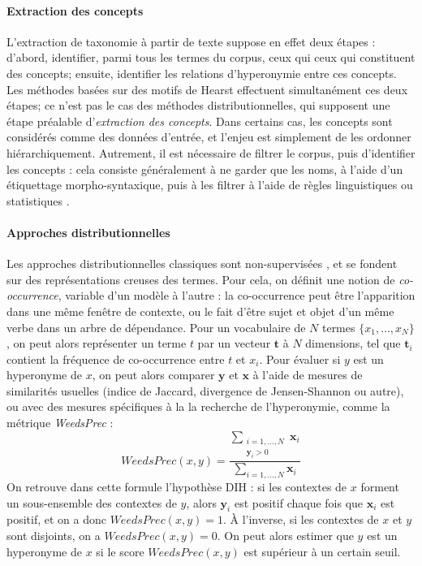 \paragraph{Extraction des concepts}

L'extraction de taxonomie à partir de texte suppose en effet deux étapes : d'abord, identifier, parmi tous les termes du corpus, ceux qui ceux qui constituent des concepts; ensuite, identifier les relations d'hyperonymie entre ces concepts. Les méthodes basées sur des motifs de Hearst effectuent simultanément ces deux étapes; ce n'est pas le cas des méthodes distributionnelles, qui supposent une étape préalable d'\textit{extraction des concepts}. Dans certains cas, les concepts sont considérés comme des données d'entrée, et l'enjeu est simplement de les ordonner hiérarchiquement. Autrement, il est nécessaire de filtrer le corpus, puis d'identifier les concepts : cela consiste généralement à ne garder que les noms, à l'aide d'un étiquettage morpho-syntaxique, puis à les filtrer à l'aide de règles linguistiques ou statistiques \cite{shang2018automated}. %

\paragraph{Approches distributionnelles}

Les approches distributionnelles classiques sont non-supervisées \cite{weeds-etal-2004-characterising}, et se fondent sur des représentations creuses des termes. Pour cela, on définit une notion de \textit{co-occurrence}, variable d'un modèle à l'autre : la co-occurrence peut être l'apparition dans une même fenêtre de contexte, ou le fait d'être sujet et objet d'un même verbe dans un arbre de dépendance. Pour un vocabulaire de $N$ termes $\{x_1, \ldots, x_N\}$, on peut alors représenter un terme $t$ par un vecteur $\textbf{t}$ à $N$ dimensions, tel que $\textbf{t}_i$ contient la fréquence de co-occurrence entre $t$ et $x_i$. Pour évaluer si $y$ est un hyperonyme de $x$, on peut alors comparer $\textbf{y}$ et $\textbf{x}$ à l'aide de mesures de similarités usuelles (indice de Jaccard, divergence de Jensen-Shannon ou autre), ou avec des mesures spécifiques à la la recherche de l'hyperonymie, comme la métrique \textit{WeedsPrec} \cite{weeds-etal-2004-characterising} :
\begin{equation}
    WeedsPrec(x, y) = \frac{\displaystyle \sum_{\substack{i=1, \ldots, N \\ \textbf{y}_i > 0}} \textbf{x}_i}{\displaystyle \sum_{i =1, \ldots, N } \textbf{x}_i}
\end{equation}
On retrouve dans cette formule l'hypothèse DIH : si les contextes de $x$ forment un sous-ensemble des contextes de $y$, alors $\textbf{y}_i$ est positif chaque fois que $\textbf{x}_i$ est positif, et on a donc $WeedsPrec(x, y) = 1$. À l'inverse, si les contextes de $x$ et $y$ sont disjoints, on a $WeedsPrec(x, y) = 0$. On peut alors estimer que $y$ est un hyperonyme de $x$ si le score $WeedsPrec(x, y)$ est supérieur à un certain seuil.

